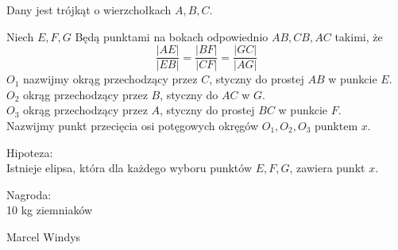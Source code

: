 \documentclass[a4paper,12pt]{memoir}
\begin{document}
\begin{vplace}

Dany jest trójkąt o wierzchołkach $A,B,C$.

Niech $E,F,G$ Będą punktami na bokach odpowiednio $AB,CB,AC$ takimi, że 
$$\frac{|AE|}{|EB|} = \frac{|BF|}{|CF|} = \frac{|GC|}{|AG|}$$
$O_{1}$ nazwijmy okrąg przechodzący przez $C$, styczny do prostej $AB$ w punkcie $E$.\\
$O_{2}$ okrąg przechodzący przez $B$, styczny do $AC$ w $G$.\\
$O_{3}$ okrąg przechodzący przez $A$, styczny do prostej $BC$ w punkcie $F$.\\
Nazwijmy punkt przecięcia osi potęgowych okręgów $O_{1},O_{2},O_{3}$ punktem $x$.

Hipoteza:\\
Istnieje elipsa, która dla każdego wyboru punktów $E,F,G$, zawiera punkt $x$.

\end{vplace}

\begin{vplace}

Nagroda:\\
10 kg ziemniaków

\begin{flushright}
	\vspace{48pt}
	Marcel Windys
\end{flushright}

\end{vplace}
\end{document}
